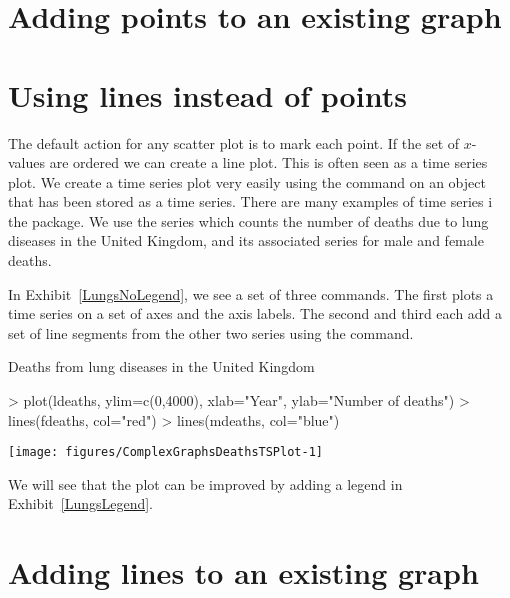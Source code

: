 \section{Adding points to an existing graph} 
 
\section{Using lines instead of points} \label{LinesInsteadOfPoints}  
 
The default action for any scatter plot is to mark each point. If the set of $x$-values are ordered we can create a line plot. This is often seen as a time series plot. We create a time series plot very easily using the  command on an object that has been stored as a time series. There are many examples of time series i the  package. We use the  series which counts the number of deaths due to lung diseases in the United Kingdom, and its associated series for male and female deaths. 
 
In Exhibit~\ref{LungsNoLegend}, we see a set of three commands. The first plots a time series on a set of axes and the axis labels. The second and third each add a set of line segments from the other two series using the  command. 
 
\begin{exhibit} 
\begin{center} 
\caption{Deaths from lung diseases in the United Kingdom} 
\label{LungsNoLegend} 
\begin{Schunk}
\begin{Sinput}
> plot(ldeaths, ylim=c(0,4000), xlab="Year", ylab="Number of deaths") 
> lines(fdeaths, col="red") 
> lines(mdeaths, col="blue") 
\end{Sinput}

\texttt{[image: figures/ComplexGraphsDeathsTSPlot-1]} \end{Schunk}
\end{center} 
\end{exhibit} 
 
We will see that the plot can be improved by adding a legend in Exhibit~\ref{LungsLegend}. 
 
 
\section{Adding lines to an existing graph} 
 

